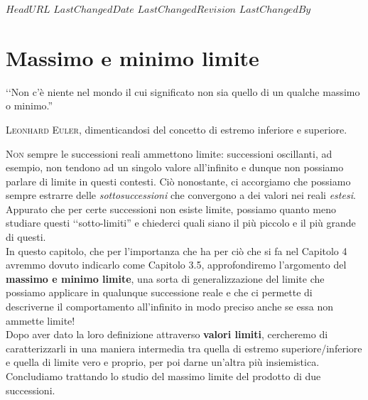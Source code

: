 \svnidlong
{$HeadURL$}
{$LastChangedDate$}
{$LastChangedRevision$}
{$LastChangedBy$}

\chapter{Massimo e minimo limite}

\begin{introduction}
	‘‘Non c'è niente nel mondo il cui significato non sia quello di un qualche massimo o minimo.''
	\begin{flushright}
		\textsc{Leonhard Euler,} dimenticandosi del concetto di estremo inferiore e superiore.
	\end{flushright}
\end{introduction}
\lettrine[findent=1pt, nindent=0pt]{N}{on} sempre le successioni reali ammettono limite: successioni oscillanti, ad esempio, non tendono ad un singolo valore all'infinito e dunque non possiamo parlare di limite in questi contesti. Ciò nonostante, ci accorgiamo che possiamo sempre estrarre delle \textit{sottosuccessioni} che convergono a dei valori nei reali \textit{estesi}. Appurato che per certe successioni non esiste limite, possiamo quanto meno studiare questi ‘‘sotto-limiti'' e chiederci quali siano il più piccolo e il più grande di questi.\\
In questo capitolo, che per l'importanza che ha per ciò che si fa nel Capitolo 4 avremmo dovuto indicarlo come Capitolo 3.5, approfondiremo l'argomento del \textbf{massimo e minimo limite}, una sorta di generalizzazione del limite che possiamo applicare in qualunque successione reale e che ci permette di descriverne il comportamento all'infinito in modo preciso anche se essa non ammette limite!\\
Dopo aver dato la loro definizione attraverso \textbf{valori limiti}, cercheremo di caratterizzarli in una maniera intermedia tra quella di estremo superiore/inferiore e quella di limite vero e proprio, per poi darne un'altra più insiemistica. Concludiamo trattando lo studio del massimo limite del prodotto di due successioni.

